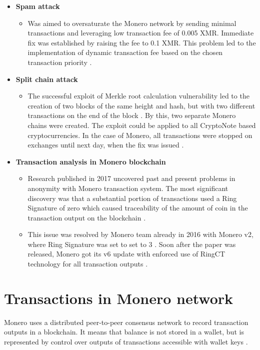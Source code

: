 \documentclass[
  printed, %
  table,   %
  lof,     %
  lot,     %
           oneside, color
]{fithesis3}
\begin{document}
\begin{itemize}
\item \textbf{Spam attack}
\begin{itemize}
\item Was aimed to oversaturate the Monero network by sending minimal transactions and leveraging low transaction fee of 0.005 XMR. Immediate fix was established by raising the fee to 0.1 XMR. This problem led to the implementation of dynamic transaction fee based on the chosen transaction priority \cite{monerospamattack}.
\end{itemize}
\item \textbf{Split chain attack}
\begin{itemize}
\item The successful exploit of Merkle root calculation vulnerability led to the creation of two blocks of the same height and hash, but with two different transactions on the end of the block \cite{macheta2014counterfeiting}. By this, two separate Monero chains were created. The exploit could be applied to all CryptoNote based cryptocurrencies. In the case of Monero, all transactions were stopped on exchanges until next day, when the fix was issued \cite{cryptonotemerkletree}.
\end{itemize}
\item \textbf{Transaction analysis in Monero blockchain}
\begin{itemize}
\item Research published in 2017 uncovered past and present problems in anonymity with Monero transaction system. The most significant discovery was that a substantial portion of transactions used a Ring Signature of zero which caused traceability of the amount of coin in the transaction output on the blockchain \cite{moser2018empirical}.
\item This issue was resolved by Monero team already in 2016 with Monero v2, where Ring Signature was set to set to 3 \cite{monerov2release}. Soon after the paper was released, Monero got its v6 update with enforced use of RingCT technology for all transaction outputs \cite{monerov6release}.
\end{itemize}
\end{itemize}
\newpage
\section{Transactions in Monero network}
Monero uses a distributed peer-to-peer consensus network to record transaction outputs in a blockchain. It means that balance is not stored in a wallet, but is represented by control over outputs of transactions accessible with wallet keys \cite{seguias2018moneroa}.
\end{document}
